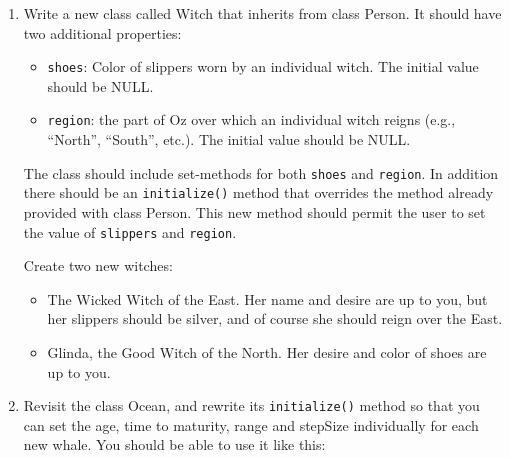 \documentclass[]{book}
\providecommand{\tightlist}{%
  \setlength{\itemsep}{0pt}\setlength{\parskip}{0pt}}
\theoremstyle{definition}
\theoremstyle{definition}
\theoremstyle{definition}
\theoremstyle{remark}
\begin{document}
{\begin{enumerate}
\def\labelenumi{\arabic{enumi}.}
\item
  Write a new class called Witch that inherits from class Person. It
  should have two additional properties:

  \begin{itemize}
  \tightlist
  \item
    \texttt{shoes}: Color of slippers worn by an individual witch. The
    initial value should be NULL.
  \item
    \texttt{region}: the part of Oz over which an individual witch
    reigns (e.g., ``North'', ``South'', etc.). The initial value should
    be NULL.
  \end{itemize}

  The class should include set-methods for both \texttt{shoes} and
  \texttt{region}. In addition there should be an \texttt{initialize()}
  method that overrides the method already provided with class Person.
  This new method should permit the user to set the value of
  \texttt{slippers} and \texttt{region}.

  Create two new witches:

  \begin{itemize}
  \tightlist
  \item
    The Wicked Witch of the East. Her name and desire are up to you, but
    her slippers should be silver, and of course she should reign over
    the East.
  \item
    Glinda, the Good Witch of the North. Her desire and color of shoes
    are up to you.
  \end{itemize}
\item
  Revisit the class Ocean, and rewrite its \texttt{initialize()} method
  so that you can set the age, time to maturity, range and stepSize
  individually for each new whale. You should be able to use it like
  this:


\end{enumerate}}
\end{document}
